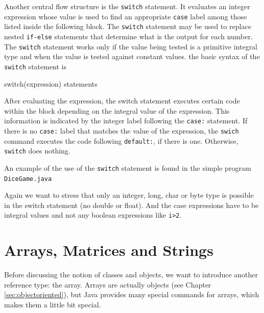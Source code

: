 Another central flow structure is the \verb|switch| statement. It
evaluates an integer expression whose value is used to find an
appropriate \verb|case| label among those listed inside the following
block. The \verb|switch| statement may be used to replace nested \verb|if-else|
statements that determine what is the output for each number. The
\verb|switch| statement works only if the value being tested is a
primitive integral type and when the value is tested against constant
values. the basic syntax of the \verb|switch| statement is
\begin{sverbatim}
switch(expression) {
    statements
}
\end{sverbatim}
After evaluating the expression, the switch statement executes
certain code within the block depending on the integral value of the
expression. This information is indicated by the integer label following
the \verb|case:| statement. If there is no \verb|case:| label that
matches the value of the expression, the \verb|swich| command executes
the code following \verb|default:|, if there is one. Otherwise,
\verb|switch| does nothing.

An example of the use of the \verb|switch| statement is found in the
simple program \verb|DiceGame.java| 



Again we want to stress that only an integer, long, char or byte type
is possible in the switch statement (no double or float). And the
case expressions have to be integral values and not any boolean
expressions like \verb|i>2|. 


\section{Arrays, Matrices and Strings}
\label{sec:Arrays}

Before discussing the notion of classes and objects, we want to introduce
another reference type: the array. Arrays are actually objects
(see Chapter \ref{sec:objectoriented}), but
Java provides many special commands for arrays, which makes them a 
little bit special.

